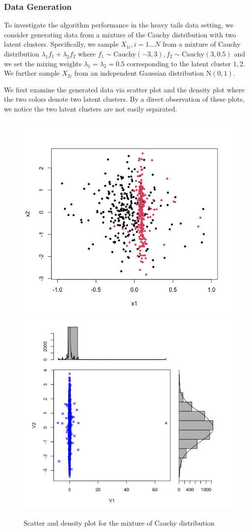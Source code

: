 \documentclass[
]{article}
\begin{document}
\hypertarget{data-generation-2}{%
\subsubsection{Data Generation}\label{data-generation-2}}

To investigate the algorithm performance in the heavy tails data
setting, we consider generating data from a mixture of the Cauchy
distribution with two latent clusters. Specifically, we sample
\(X_{1i}, i = 1...N\) from a mixture of Cauchy distribution
\(\lambda_1f_1 + \lambda_2f_2\) where
\(f_1 \sim \text{Cauchy}(-3,3), f_2 \sim \text{Cauchy}(3,0.5)\) and we
set the mixing weights \(\lambda_1 = \lambda_2 = 0.5\) corresponding to
the latent cluster \(1,2\). We further sample \(X_{2i}\) from an
independent Gaussian distribution \(\text{N}(0,1)\).

We first examine the generated data via scatter plot and the density
plot where the two colors denote two latent clusters. By a direct
observation of these plots, we notice the two latent clusters are not
easily separated.

\begin{figure}

{\centering \includegraphics[width=0.49\linewidth]{report_image/cauchy} \includegraphics[width=0.49\linewidth]{report_image/cauchy_2} 

}

\caption{Scatter and density plot for the mixture of Cauchy distribution}\label{fig:unnamed-chunk-2}
\end{figure}
\end{document}
